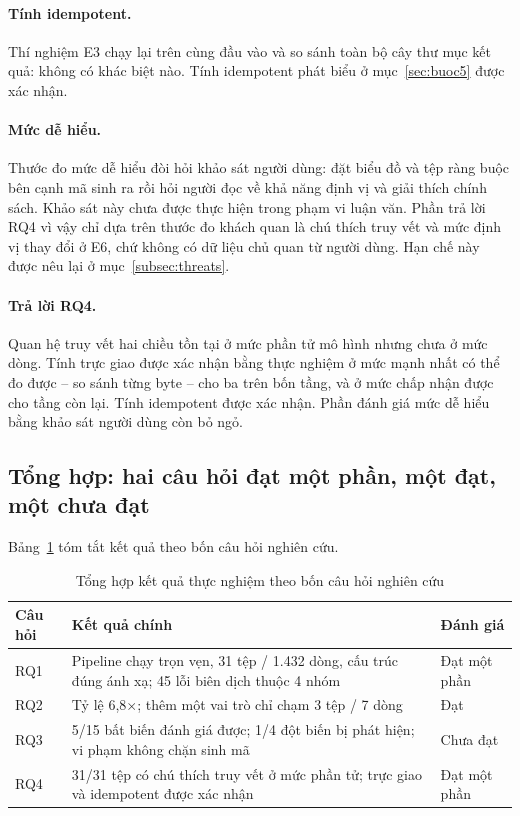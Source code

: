 \paragraph{Tính idempotent.}
Thí nghiệm E3 chạy lại trên cùng đầu vào và so sánh toàn bộ cây thư mục kết quả: không có khác biệt nào. Tính idempotent phát biểu ở mục~\ref{sec:buoc5} được xác nhận.

\paragraph{Mức dễ hiểu.}
Thước đo mức dễ hiểu đòi hỏi khảo sát người dùng: đặt biểu đồ và tệp ràng buộc bên cạnh mã sinh ra rồi hỏi người đọc về khả năng định vị và giải thích chính sách. Khảo sát này chưa được thực hiện trong phạm vi luận văn. Phần trả lời RQ4 vì vậy chỉ dựa trên thước đo khách quan là chú thích truy vết và mức định vị thay đổi ở E6, chứ không có dữ liệu chủ quan từ người dùng. Hạn chế này được nêu lại ở mục~\ref{subsec:threats}.

\paragraph{Trả lời RQ4.}
Quan hệ truy vết hai chiều tồn tại ở mức phần tử mô hình nhưng chưa ở mức dòng. Tính trực giao được xác nhận bằng thực nghiệm ở mức mạnh nhất có thể đo được -- so sánh từng byte -- cho ba trên bốn tầng, và ở mức chấp nhận được cho tầng còn lại. Tính idempotent được xác nhận. Phần đánh giá mức dễ hiểu bằng khảo sát người dùng còn bỏ ngỏ.

\subsection{Tổng hợp: hai câu hỏi đạt một phần, một đạt, một chưa đạt}

Bảng~\ref{tab:tong-hop} tóm tắt kết quả theo bốn câu hỏi nghiên cứu.

\begin{table}[htbp]
\centering
\caption{Tổng hợp kết quả thực nghiệm theo bốn câu hỏi nghiên cứu}
\label{tab:tong-hop}
\small
\begin{tabularx}{\textwidth}{@{}lXl@{}}
\toprule
\textbf{Câu hỏi} & \textbf{Kết quả chính} & \textbf{Đánh giá} \\
\midrule
RQ1 & Pipeline chạy trọn vẹn, 31 tệp / 1.432 dòng, cấu trúc đúng ánh xạ; 45 lỗi biên dịch thuộc 4 nhóm & Đạt một phần \\
RQ2 & Tỷ lệ 6,8$\times$; thêm một vai trò chỉ chạm 3 tệp / 7 dòng & Đạt \\
RQ3 & 5/15 bất biến đánh giá được; 1/4 đột biến bị phát hiện; vi phạm không chặn sinh mã & Chưa đạt \\
RQ4 & 31/31 tệp có chú thích truy vết ở mức phần tử; trực giao và idempotent được xác nhận & Đạt một phần \\
\bottomrule
\end{tabularx}
\end{table}

